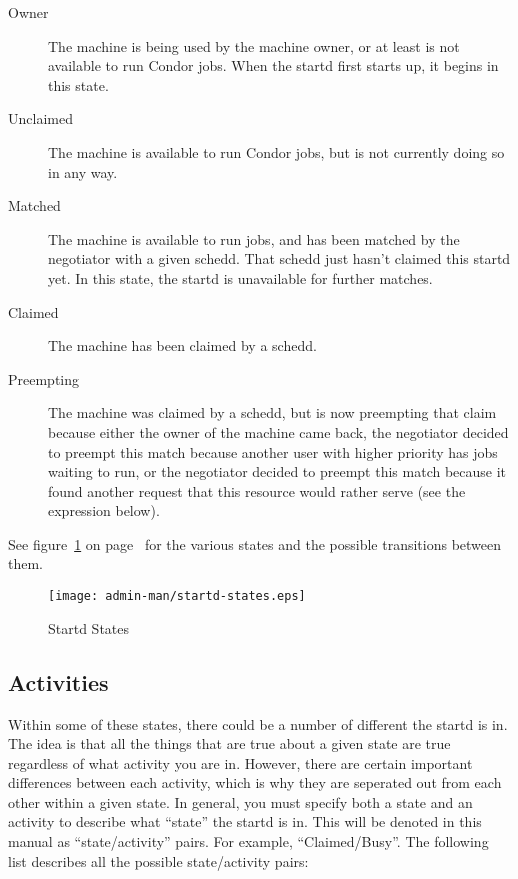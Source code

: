 \begin{description}
  
\item[Owner] The machine is being used by the machine owner, or at
  least is not available to run Condor jobs.  When the startd first
  starts up, it begins in this state.
  
\item[Unclaimed] The machine is available to run Condor jobs, but is
  not currently doing so in any way.
  
\item[Matched] The machine is available to run jobs, and has been
  matched by the negotiator with a given schedd.  That schedd just
  hasn't claimed this startd yet.  In this state, the startd is
  unavailable for further matches.

\item[Claimed] The machine has been claimed by a schedd. 
  
\item[Preempting] The machine was claimed by a schedd, but is now
  preempting that claim because either the owner of the machine came
  back, the negotiator decided to preempt this match because another
  user with higher priority has jobs waiting to run, or the negotiator
  decided to preempt this match because it found another request that
  this resource would rather serve (see the  expression
  below).

\end{description}

See figure~\ref{fig:startd-states} on page~\pageref{fig:startd-states}
for the various states and the possible transitions between them.

\begin{figure}[hbt]
\centering
\texttt{[image: admin-man/startd-states.eps]}
\caption{\label{fig:startd-states}Startd States}
\end{figure}

\subsection{ Activities}
\label{sec:Activities}

Within some of these states, there could be a number of different
 the startd is in.  The idea is that all the things
that are true about a given state are true regardless of what activity
you are in.  However, there are certain important differences between
each activity, which is why they are seperated out from each other
within a given state.  In general, you must specify both a state and
an activity to describe what ``state'' the startd is in.  This will be
denoted in this manual as ``state/activity'' pairs.  For example,
``Claimed/Busy''.  The following list describes all the possible
state/activity pairs:

